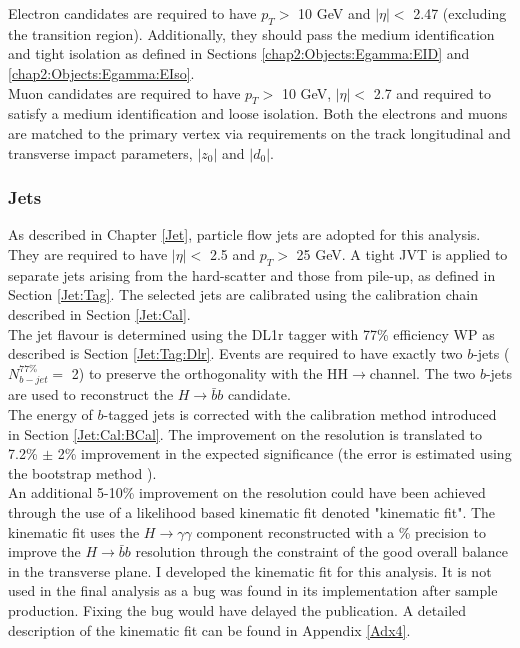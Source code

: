 Electron candidates are required to have $p_T > $ 10 GeV and $|\eta| < $ 2.47 (excluding the transition region). Additionally, they should pass the medium identification and tight isolation as defined in Sections \ref{chap2:Objects:Egamma:EID} and \ref{chap2:Objects:Egamma:EIso}. \\
Muon candidates are required to have $p_T > $ 10 GeV, $|\eta| < $ 2.7 and required to satisfy a medium identification and loose isolation. Both the electrons and muons are matched to the primary vertex via requirements on the track longitudinal and transverse impact parameters, $|z_0|$ and $|d_0|$.

\subsubsection{Jets}
\label{HHyybb:ObjEvt:Obj:Jet}
As described in Chapter \ref{Jet}, particle flow jets are adopted for this analysis. They are required to have $|\eta| < $ 2.5 and $p_T > $ 25 GeV. A tight JVT is applied to separate jets arising from the hard-scatter and those from pile-up, as defined in Section \ref{Jet:Tag}. The selected jets are calibrated using the calibration chain described in Section \ref{Jet:Cal}. \\

The jet flavour is determined using the DL1r tagger with 77\% efficiency WP as described is Section \ref{Jet:Tag:Dlr}. Events are required to have exactly two $b$-jets ($N_{b-jet}^{77\%} = $ 2) to preserve the orthogonality with the HH$\to$\bbbb channel. The two $b$-jets are used to reconstruct the $H\to\bar{b}b$ candidate. \\
The energy of $b$-tagged jets is corrected with the calibration method introduced in Section \ref{Jet:Cal:BCal}. The improvement on the \mbb resolution is translated to 7.2\% $\pm$ 2\% improvement in the expected significance (the error is estimated using the bootstrap method \cite{Bootstrap}). \\
An additional 5-10\% improvement on the \mbb resolution could have been achieved through the use of a likelihood based kinematic fit denoted "kinematic fit". The kinematic fit uses the $H\to\gamma\gamma$ component reconstructed with a \% precision to improve the $H\to\bar{b}b$ resolution through the constraint of the good overall balance in the transverse plane. I developed the kinematic fit for this \HHyybb analysis. It is not used in the final analysis as a bug was found in its implementation after sample production. Fixing the bug would have delayed the publication. A detailed description of the kinematic fit can be found in Appendix \ref{Adx4}. \\

